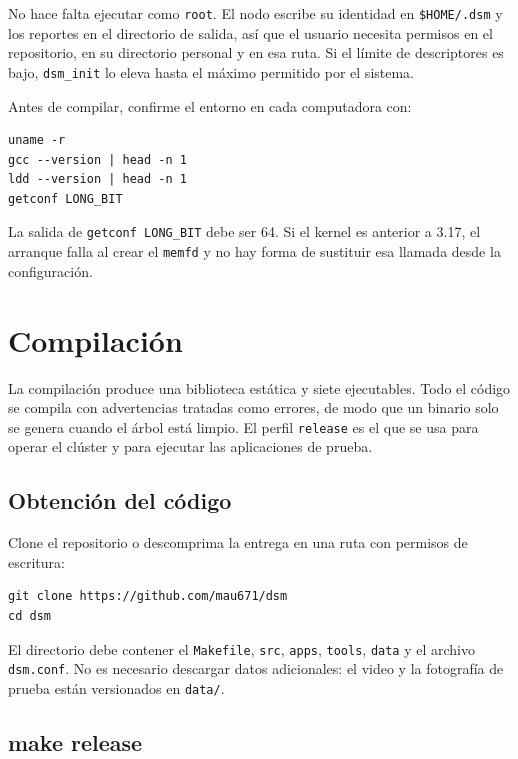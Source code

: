 No hace falta ejecutar como \texttt{root}. El nodo escribe su identidad en \texttt{\$HOME/.dsm} y los reportes en el directorio de salida, así que el usuario necesita permisos en el repositorio, en su directorio personal y en esa ruta. Si el límite de descriptores es bajo, \texttt{dsm\_init} lo eleva hasta el máximo permitido por el sistema.

Antes de compilar, confirme el entorno en cada computadora con:

\begin{lstlisting}
uname -r
gcc --version | head -n 1
ldd --version | head -n 1
getconf LONG_BIT
\end{lstlisting}

La salida de \texttt{getconf LONG\_BIT} debe ser 64. Si el kernel es anterior a 3.17, el arranque falla al crear el \texttt{memfd} y no hay forma de sustituir esa llamada desde la configuración.

\section{Compilación}\label{sec:compilacion}

La compilación produce una biblioteca estática y siete ejecutables. Todo el código se compila con advertencias tratadas como errores, de modo que un binario solo se genera cuando el árbol está limpio. El perfil \texttt{release} es el que se usa para operar el clúster y para ejecutar las aplicaciones de prueba.

\subsection{Obtención del código}\label{subsec:obtencion-codigo}

Clone el repositorio o descomprima la entrega en una ruta con permisos de escritura:

\begin{lstlisting}
git clone https://github.com/mau671/dsm
cd dsm
\end{lstlisting}

El directorio debe contener el \texttt{Makefile}, \texttt{src}, \texttt{apps}, \texttt{tools}, \texttt{data} y el archivo \texttt{dsm.conf}. No es necesario descargar datos adicionales: el video y la fotografía de prueba están versionados en \texttt{data/}.

\subsection{make release}\label{subsec:make-release}


